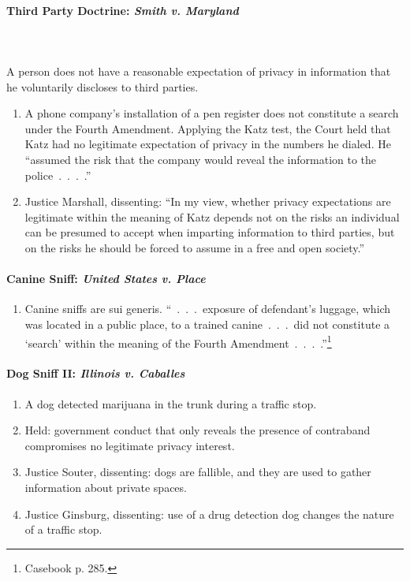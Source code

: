 \paragraph{Third Party Doctrine: \emph{Smith v. Maryland}}
~\\\\
A person does not have a reasonable expectation of privacy in information that 
he voluntarily discloses to third parties.

\begin{enumerate}
    \item A phone company's installation of a pen register does not constitute 
    a search under the Fourth Amendment. Applying the Katz test, the Court 
    held that Katz had no legitimate expectation of privacy in the numbers he 
    dialed. He ``assumed the risk that the company would reveal the 
    information to the police~.~.~.~.''
    \item Justice Marshall, dissenting: ``In my view, whether privacy 
    expectations are legitimate within the meaning of Katz depends not on the 
    risks an individual can be presumed to accept when imparting information 
    to third parties, but on the risks he should be forced to assume in a free 
    and open society.''
\end{enumerate}

\paragraph{Canine Sniff: \emph{United States v. Place}}

\begin{enumerate}
    \item Canine sniffs are sui generis. ``~.~.~.~exposure of defendant's 
    luggage, which was located in a public place, to a trained 
    canine~.~.~.~did not constitute a `search' within the meaning of the 
    Fourth Amendment~.~.~.~.''\footnote{Casebook p. 285.}
\end{enumerate}

\paragraph{Dog Sniff II: \emph{Illinois v. Caballes}}

\begin{enumerate}
    \item A dog detected marijuana in the trunk during a traffic stop.
    \item Held: government conduct that only reveals the presence of 
    contraband compromises no legitimate privacy interest.
    \item Justice Souter, dissenting: dogs are fallible, and they are used to 
    gather information about private spaces.
    \item Justice Ginsburg, dissenting: use of a drug detection dog changes 
    the nature of a traffic stop.
\end{enumerate}

